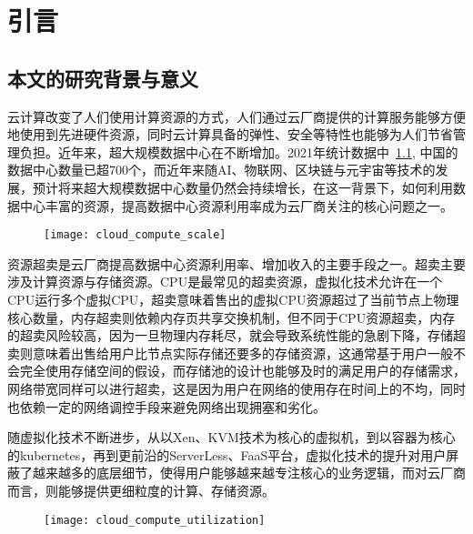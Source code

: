 \chapter{引言}\label{chap:introduction}

\section{本文的研究背景与意义}

云计算改变了人们使用计算资源的方式，人们通过云厂商提供的计算服务能够方便地使用到先进硬件资源，同时云计算具备的弹性、安全等特性也能够为人们节省管理负担。近年来，超大规模数据中心在不断增加。2021年统计数据中~\ref{fig:cloud_compute_scale}, 中国的数据中心数量已超700个，而近年来随AI、物联网、区块链与元宇宙等技术的发展，预计将来超大规模数据中心数量仍然会持续增长，在这一背景下，如何利用数据中心丰富的资源，提高数据中心资源利用率成为云厂商关注的核心问题之一。

\begin{figure}[!htbp]
    \centering
    \texttt{[image: cloud\_compute\_scale]}
    \label{fig:cloud_compute_scale}
\end{figure}

资源超卖是云厂商提高数据中心资源利用率、增加收入的主要手段之一。超卖主要涉及计算资源与存储资源。CPU是最常见的超卖资源，虚拟化技术允许在一个CPU运行多个虚拟CPU，超卖意味着售出的虚拟CPU资源超过了当前节点上物理核心数量，内存超卖则依赖内存页共享交换机制，但不同于CPU资源超卖，内存的超卖风险较高，因为一旦物理内存耗尽，就会导致系统性能的急剧下降，存储超卖则意味着出售给用户比节点实际存储还要多的存储资源，这通常基于用户一般不会完全使用存储空间的假设，而存储池的设计也能够及时的满足用户的存储需求，网络带宽同样可以进行超卖，这是因为用户在网络的使用存在时间上的不均，同时也依赖一定的网络调控手段来避免网络出现拥塞和劣化。

随虚拟化技术不断进步，从以Xen、KVM技术为核心的虚拟机，到以容器为核心的kubernetes，再到更前沿的ServerLess、FaaS平台，虚拟化技术的提升对用户屏蔽了越来越多的底层细节，使得用户能够越来越专注核心的业务逻辑，而对云厂商而言，则能够提供更细粒度的计算、存储资源。

\begin{figure}[!htbp]
    \centering
    \texttt{[image: cloud\_compute\_utilization]}
    \label{fig:cloud_compute_utilization}
\end{figure}

